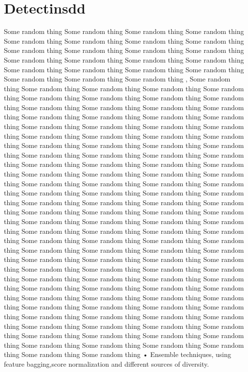 \section{Detectinsdd}
Some random thing Some random thing Some random thing Some random thing Some random thing Some random thing Some random thing Some random thing Some random thing Some random thing Some random thing Some random thing Some random thing Some random thing Some random thing Some random thing Some random thing Some random thing Some random thing Some random thing Some random thing Some random thing Some random thing  \cite{roch}, Some random thing Some random thing Some random thing Some random thing Some random thing Some random thing Some random thing Some random thing Some random thing Some random thing Some random thing Some random thing Some random thing Some random thing Some random thing Some random thing Some random thing Some random thing Some random thing Some random thing Some random thing Some random thing Some random thing  \cite{Sari2015}
Some random thing Some random thing Some random thing Some random thing Some random thing Some random thing Some random thing Some random thing Some random thing Some random thing Some random thing Some random thing Some random thing Some random thing Some random thing Some random thing Some random thing Some random thing Some random thing Some random thing Some random thing Some random thing Some random thing  
Some random thing Some random thing Some random thing Some random thing Some random thing Some random thing Some random thing Some random thing Some random thing Some random thing Some random thing Some random thing Some random thing Some random thing Some random thing Some random thing Some random thing Some random thing Some random thing Some random thing Some random thing Some random thing Some random thing  \cite{pannu} Some random thing Some random thing Some random thing Some random thing Some random thing Some random thing Some random thing Some random thing Some random thing Some random thing Some random thing Some random thing Some random thing Some random thing Some random thing Some random thing Some random thing Some random thing Some random thing Some random thing Some random thing Some random thing Some random thing  
Some random thing Some random thing Some random thing Some random thing Some random thing Some random thing Some random thing Some random thing Some random thing Some random thing Some random thing Some random thing Some random thing Some random thing Some random thing Some random thing Some random thing Some random thing Some random thing Some random thing Some random thing Some random thing Some random thing  \cite{dhanl}\newline
•	Ensemble techniques, using feature bagging,score normalization and different sources of diversity.\newline

